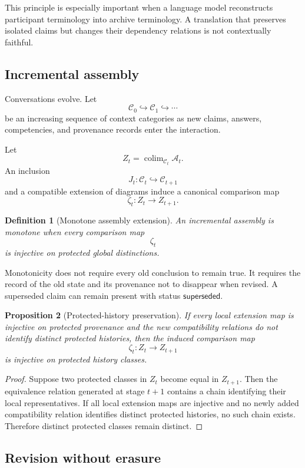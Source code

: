\documentclass[11pt]{article}
\newtheorem{definition}{Definition}[section]
\newtheorem{proposition}[definition]{Proposition}
\theoremstyle{definition}
\DeclareMathOperator{\colim}{colim}
\newcommand{\C}{\mathcal{C}}
\newcommand{\A}{\mathcal{A}}
\begin{document}
This principle is especially important when a language model reconstructs participant terminology into archive terminology. A translation that preserves isolated claims but changes their dependency relations is not contextually faithful.

\subsection{Incremental assembly}

Conversations evolve. Let
\[
\C_0\hookrightarrow\C_1\hookrightarrow\cdots
\]
be an increasing sequence of context categories as new claims, answers, competencies, and provenance records enter the interaction.

Let
\[
Z_t
=
\colim_{\C_t}\A_t.
\]
An inclusion
\[
J_t:\C_t\hookrightarrow\C_{t+1}
\]
and a compatible extension of diagrams induce a canonical comparison map
\[
\zeta_t:Z_t\to Z_{t+1}.
\]

\begin{definition}[Monotone assembly extension]
An incremental assembly is monotone when every comparison map
\[
\zeta_t
\]
is injective on protected global distinctions.
\end{definition}

Monotonicity does not require every old conclusion to remain true. It requires the record of the old state and its provenance not to disappear when revised. A superseded claim can remain present with status \(\mathsf{superseded}\).

\begin{proposition}[Protected-history preservation]
If every local extension map is injective on protected provenance and the new compatibility relations do not identify distinct protected histories, then the induced comparison map
\[
\zeta_t:Z_t\to Z_{t+1}
\]
is injective on protected history classes.
\end{proposition}

\begin{proof}
Suppose two protected classes in \(Z_t\) become equal in \(Z_{t+1}\). Then the equivalence relation generated at stage \(t+1\) contains a chain identifying their local representatives. If all local extension maps are injective and no newly added compatibility relation identifies distinct protected histories, no such chain exists. Therefore distinct protected classes remain distinct.
\end{proof}

\subsection{Revision without erasure}
\end{document}
